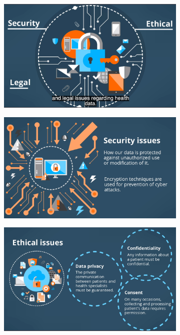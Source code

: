 \documentclass[10pt, twoside]{article}   	%
\begin{document}
 \begin{figure}
     \centering
     \begin{subfigure}[b]{0.3\textwidth}
         \centering
         \includegraphics[width=\textwidth]{DataProtection_Issues.png}
     \end{subfigure}
     \hfill
     \begin{subfigure}[b]{0.3\textwidth}
         \centering
         \includegraphics[width=\textwidth]{Security.png}
     \end{subfigure}
     \hfill
\begin{subfigure}[b]{0.3\textwidth}
    \centering
    \includegraphics[width=\textwidth]{Ethics.png}

\end{subfigure}
\end{figure}
\end{document}
